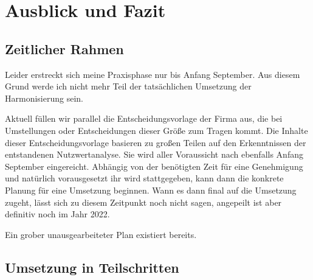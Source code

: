 \chapter{Ausblick und Fazit} %
\label{cha:Ausblick und Fazit}

\section{Zeitlicher Rahmen} %
\label{sec:Zeitlicher Rahmen}

Leider erstreckt sich meine Praxisphase nur bis Anfang September. Aus diesem Grund werde ich nicht mehr Teil der tatsächlichen Umsetzung der Harmonisierung sein.

Aktuell füllen wir parallel die Entscheidungsvorlage der Firma aus, die bei Umstellungen oder Entscheidungen dieser Größe zum Tragen kommt. Die Inhalte dieser Entscheidungsvorlage basieren zu großen Teilen auf den Erkenntnissen der entstandenen Nutzwertanalyse. Sie wird aller Voraussicht nach ebenfalls Anfang September eingereicht. Abhängig von der benötigten Zeit für eine Genehmigung und natürlich vorausgesetzt ihr wird stattgegeben, kann dann die konkrete Planung für eine Umsetzung beginnen. Wann es dann final auf die Umsetzung zugeht, lässt sich zu diesem Zeitpunkt noch nicht sagen, angepeilt ist aber definitiv noch im Jahr 2022.

Ein grober unausgearbeiteter Plan existiert bereits. 


\section{Umsetzung in Teilschritten} %
\label{sec:Umsetzung in Teilschritten}

